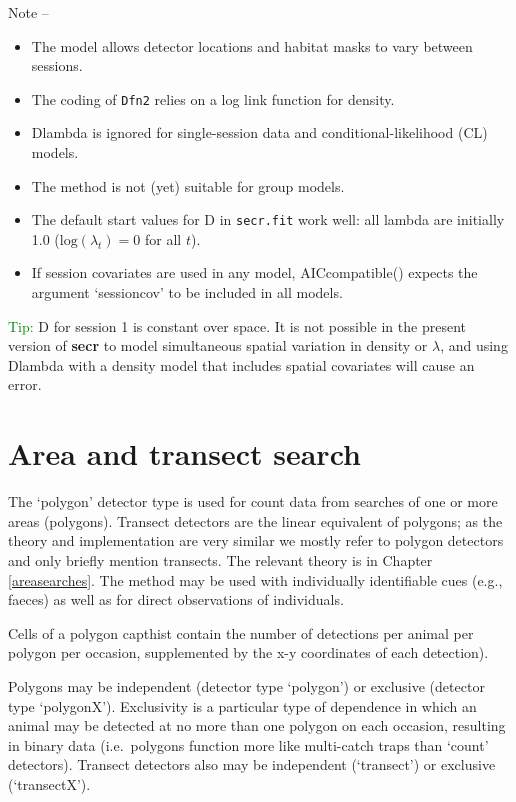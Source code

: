 \documentclass[
]{book}
\begin{document}
Note --

\begin{itemize}
\item
  The model allows detector locations and habitat masks to vary between sessions.
\item
  The coding of \texttt{Dfn2} relies on a log link function for density.
\item
  Dlambda is ignored for single-session data and conditional-likelihood (CL) models.
\item
  The method is not (yet) suitable for group models.
\item
  The default start values for D in \texttt{secr.fit} work well: all lambda are initially 1.0 (\(\mbox{log}(\lambda_t) = 0\) for all \(t\)).
\item
  If session covariates are used in any model, AICcompatible() expects the argument `sessioncov' to be included in all models.
\end{itemize}

\textcolor{green}{Tip:} D for session 1 is constant over space. It is not possible in the present version of \textbf{secr} to model simultaneous spatial variation in density or \(\lambda\), and using Dlambda with a density model that includes spatial covariates will cause an error.

\chapter{Area and transect search}\label{Areaandtransectsearches}

The `polygon' detector type is used for count data from searches of one or more areas (polygons). Transect detectors are the linear equivalent of polygons; as the theory and implementation are very similar we mostly refer to polygon detectors and only briefly mention transects. The relevant theory is in Chapter \ref{areasearches}. The method may be used with individually identifiable cues (e.g., faeces) as well as for direct observations of individuals.

Cells of a polygon capthist contain the number of detections per animal per polygon per occasion, supplemented by the x-y coordinates of each detection).

Polygons may be independent (detector type `polygon') or exclusive (detector type `polygonX'). Exclusivity is a particular type of dependence in which an animal may be detected at no more than one polygon on each occasion, resulting in binary data (i.e.~polygons function more like multi-catch traps than `count' detectors). Transect detectors also may be independent (`transect') or exclusive (`transectX').
\end{document}
